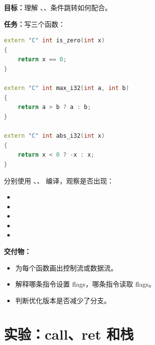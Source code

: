 \begin{labbox}
\textbf{目标：}理解 、、条件跳转如何配合。

\textbf{任务：}写三个函数：

\begin{lstlisting}[language=C++]
extern "C" int is_zero(int x)
{
    return x == 0;
}

extern "C" int max_i32(int a, int b)
{
    return a > b ? a : b;
}

extern "C" int abs_i32(int x)
{
    return x < 0 ? -x : x;
}
\end{lstlisting}

分别使用 、、 编译，观察是否出现：

\begin{itemize}
  \item {}
  \item {}
  \item {}
  \item {}
  \item {}
\end{itemize}

\textbf{交付物：}

\begin{itemize}
  \item 为每个函数画出控制流或数据流。
  \item 解释哪条指令设置 flags，哪条指令读取 flags。
  \item 判断优化版本是否减少了分支。
\end{itemize}
\end{labbox}

\section{实验：call、ret 和栈}

